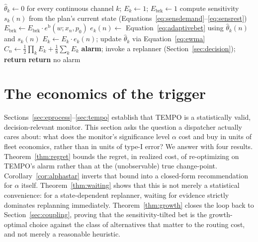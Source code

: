 \documentclass[trsc,dblanonrev]{informs4}
\begin{document}
\begin{algorithm}
\caption{TEMPO monitor (one segment)}\label{alg:tempo}
\begin{algorithmic}[1]
  \State $\widehat\theta_k \gets 0$ for every continuous channel $k$;
         $E_k \gets 1$; $E_{\mathrm{brk}} \gets 1$
    \State compute sensitivity $s_k(n)$ from the plan's current state
           (Equations~\eqref{eq:sensdemand}--\eqref{eq:sensrest})
      \State $E_{\mathrm{brk}} \gets E_{\mathrm{brk}} \cdot
             e^{\mathrm b}(w; x_n, p_0)$ 
    \Else
      \State $e_k(n) \gets$ Equation~\eqref{eq:adaptivebet} using
             $\widehat\theta_k(n)$ and $s_k(n)$
      \State $E_k \gets E_k \cdot e_k(n)$; update $\widehat\theta_k$
             via Equation~\eqref{eq:ewma}
    \EndIf
    \State $C_n \gets \tfrac{1}{2}\prod_k E_k + \tfrac{1}{8}\sum_k E_k$
      \State \textbf{alarm}; invoke a replanner (Section~\ref{sec:decision}); \textbf{return}
    \EndIf
  \EndFor
  \State \textbf{return} no alarm
\EndProcedure
\end{algorithmic}
\end{algorithm}

\section{The economics of the trigger}\label{sec:theory}

Sections~\ref{sec:eprocess}--\ref{sec:tempo} establish that TEMPO is a
statistically valid, decision-relevant monitor. This section asks the
question a dispatcher actually cares about: what does the monitor's
significance level $\alpha$ cost and buy in units of fleet economics,
rather than in units of type-I error? We answer with four results.
Theorem~\ref{thm:regret} bounds the regret, in realized cost, of
re-optimizing on TEMPO's alarm rather than at the (unobservable) true
change-point. Corollary~\ref{cor:alphastar} inverts that bound into a
closed-form recommendation for $\alpha$ itself. Theorem~\ref{thm:waiting}
shows that this is not merely a statistical convenience: for a
state-dependent replanner, waiting for evidence strictly dominates
replanning immediately. Theorem~\ref{thm:growth} closes the loop back
to Section~\ref{sec:coupling}, proving that the sensitivity-tilted bet
is the growth-optimal choice against the class of alternatives that
matter to the routing cost, and not merely a reasonable heuristic.
\end{document}
